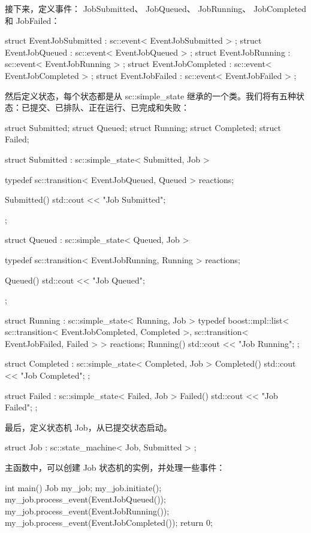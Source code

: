接下来，定义事件： JobSubmitted、 JobQueued、 JobRunning、 JobCompleted 和 JobFailed：

\begin{cpp}
struct EventJobSubmitted : sc::event< EventJobSubmitted > {};
struct EventJobQueued : sc::event< EventJobQueued > {};
struct EventJobRunning : sc::event< EventJobRunning > {};
struct EventJobCompleted : sc::event< EventJobCompleted > {};
struct EventJobFailed : sc::event< EventJobFailed > {};
\end{cpp}

然后定义状态，每个状态都是从 sc::simple\_state 继承的一个类。我们将有五种状态：已提交、已排队、正在运行、已完成和失败：

\begin{cpp}
struct Submitted;
struct Queued;
struct Running;
struct Completed;
struct Failed;

struct Submitted : sc::simple_state< Submitted, Job > {
    typedef sc::transition< EventJobQueued, Queued > reactions;

    Submitted() { std::cout << "Job Submitted\n"; }
};

struct Queued : sc::simple_state< Queued, Job > {
    typedef sc::transition< EventJobRunning, Running > reactions;

    Queued() { std::cout << "Job Queued\n"; }
};

struct Running : sc::simple_state< Running, Job > {
    typedef boost::mpl::list<
        sc::transition< EventJobCompleted, Completed >,
        sc::transition< EventJobFailed, Failed >
    > reactions;
    Running() { std::cout << "Job Running\n"; }
};

struct Completed : sc::simple_state< Completed, Job > {
    Completed() { std::cout << "Job Completed\n"; }
};

struct Failed : sc::simple_state< Failed, Job > {
    Failed() { std::cout << "Job Failed\n"; }
};
\end{cpp}

最后，定义状态机 Job，从已提交状态启动。

\begin{cpp}
struct Job : sc::state_machine< Job, Submitted > {};
\end{cpp}

主函数中，可以创建 Job 状态机的实例，并处理一些事件：

\begin{cpp}
int main() {
    Job my_job;
    my_job.initiate();
    my_job.process_event(EventJobQueued());
    my_job.process_event(EventJobRunning());
    my_job.process_event(EventJobCompleted());
    return 0;
}
\end{cpp}

